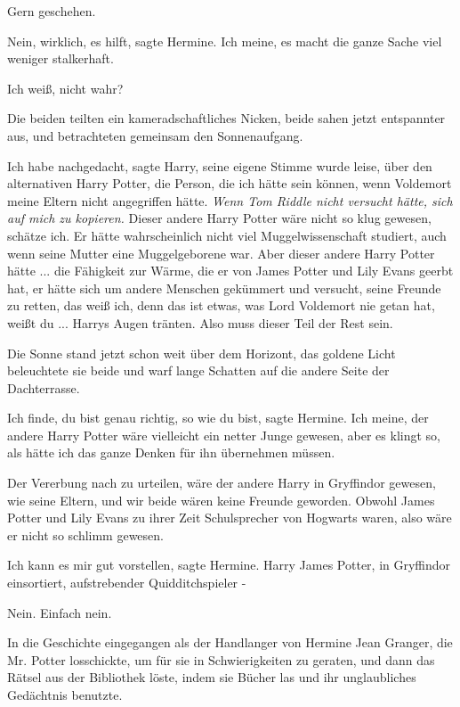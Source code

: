\glqq{}Gern geschehen.\grqq{}

\glqq{}Nein, wirklich, es hilft\grqq{}, sagte Hermine. \glqq{}Ich meine, es macht
die ganze Sache viel weniger stalkerhaft.\grqq{}

\glqq{}Ich weiß, nicht wahr?\grqq{}

Die beiden teilten ein kameradschaftliches Nicken, beide sahen jetzt entspannter
aus, und betrachteten gemeinsam den Sonnenaufgang.

\glqq{}Ich habe nachgedacht\grqq{}, sagte Harry, seine eigene Stimme wurde leise,
\glqq{}über den alternativen Harry Potter, die Person, die ich hätte sein können,
wenn Voldemort meine Eltern nicht angegriffen hätte.\grqq{}
\emph{Wenn Tom Riddle nicht versucht hätte, sich auf mich zu kopieren.}
\glqq{}Dieser andere Harry Potter wäre nicht so klug gewesen, schätze ich. Er
hätte wahrscheinlich nicht viel Muggelwissenschaft studiert, auch wenn seine
Mutter eine Muggelgeborene war. Aber dieser andere Harry Potter hätte ... die
Fähigkeit zur Wärme, die er von James Potter und Lily Evans geerbt hat, er hätte
sich um andere Menschen gekümmert und versucht, seine Freunde zu retten, das
weiß ich, denn das ist etwas, was Lord Voldemort nie getan hat, weißt du ...\grqq{}
Harrys Augen tränten. \glqq{}Also muss dieser Teil der Rest sein.\grqq{}

Die Sonne stand jetzt schon weit über dem Horizont, das goldene Licht
beleuchtete sie beide und warf lange Schatten auf die andere Seite der
Dachterrasse.

\glqq{}Ich finde, du bist genau richtig, so wie du bist\grqq{}, sagte Hermine.
\glqq{}Ich meine, der andere Harry Potter wäre vielleicht ein netter Junge
gewesen, aber es klingt so, als hätte ich das ganze Denken für ihn übernehmen
müssen.\grqq{}

\glqq{}Der Vererbung nach zu urteilen, wäre der andere Harry in Gryffindor
gewesen, wie seine Eltern, und wir beide wären keine Freunde geworden. Obwohl
James Potter und Lily Evans zu ihrer Zeit Schulsprecher von Hogwarts waren, also
wäre er nicht so schlimm gewesen.\grqq{}

\glqq{}Ich kann es mir gut vorstellen\grqq{}, sagte Hermine. \glqq{}Harry James
Potter, in Gryffindor einsortiert, aufstrebender Quidditchspieler -\grqq{}

\glqq{}Nein. Einfach nein.\grqq{}

\glqq{}In die Geschichte eingegangen als der Handlanger von Hermine Jean Granger,
die Mr. Potter losschickte, um für sie in Schwierigkeiten zu geraten, und dann
das Rätsel aus der Bibliothek löste, indem sie Bücher las und ihr unglaubliches
Gedächtnis benutzte.\grqq{}

